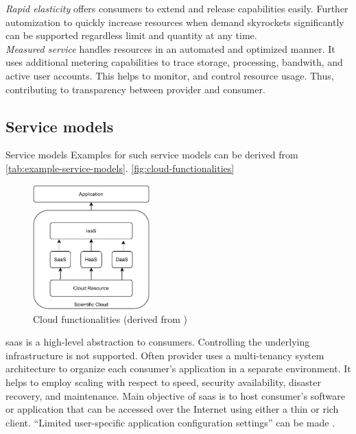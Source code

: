 \textit{Rapid elasticity} offers consumers to extend and release capabilities easily. Further automization to quickly increase resources  when demand skyrockets significantly can be supported regardless limit and quantity at any time.\\

\textit{Measured service} handles resources in an automated and optimized manner. It uses additional metering capabilities to trace storage, processing, bandwith, and active user accounts. This helps to monitor, and control resource usage. Thus, contributing to transparency between provider and consumer.

\subsection{Service models}
\label{subsec:cloud-service}

Service models Examples for such service models can be derived from \autoref{tab:example-service-models}. \autoref{fig:cloud-functionalities}\\

\begin{figure}[h]
    \centering
    \includegraphics[width=0.4\textwidth]{figures/cloud-functionalities.pdf}
    \caption{Cloud functionalities (derived from \cite{Wang2010})}
    \label{fig:cloud-functionalities}
\end{figure}

\ac{saas} is a high-level abstraction to consumers. Controlling the underlying infrastructure is not supported. Often provider uses a multi-tenancy system architecture to organize each consumer's application in a separate environment. It helps to employ scaling with respect to speed, security availability, disaster recovery, and maintenance. Main objective of \ac{saas} is to host consumer's software or application that can be accessed over the Internet using either a thin or rich client.\cite{Dillon2010} \enquote{Limited user-specific application configuration settings} can be made \cite{Mell2011}.\\

